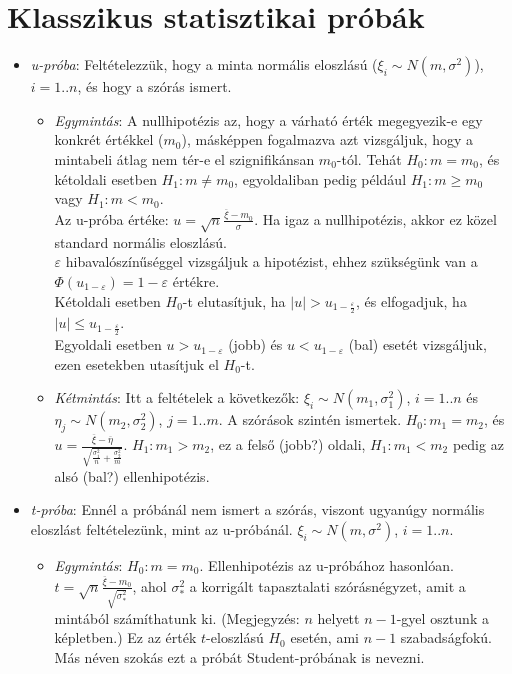 \documentclass[margin=0px]{article}
\begin{document}
\section{Klasszikus statisztikai próbák}

\begin{itemize}
    \item \textit{u-próba}: Feltételezzük, hogy a minta normális eloszlású ($\xi_i \sim N(m, \sigma^2)$), $i=1..n$, és hogy a szórás ismert.
          \begin{itemize}
              \item \textit{Egymintás}: A nullhipotézis az, hogy a várható érték megegyezik-e egy konkrét értékkel ($m_0$), másképpen fogalmazva azt vizsgáljuk, hogy a mintabeli átlag nem tér-e el szignifikánsan $m_0$-tól. Tehát $H_0: m = m_0$, és kétoldali esetben $H_1: m \neq m_0$, egyoldaliban pedig például $H_1: m \geq m_0$ vagy $H_1: m < m_0$. \\
                    Az u-próba értéke: $u = \sqrt{n}\frac{\overline{\xi} - m_0}{\sigma}$. Ha igaz a nullhipotézis, akkor ez közel standard normális eloszlású. \\
                    $\varepsilon$ hibavalószínűséggel vizsgáljuk a hipotézist, ehhez szükségünk van a $\Phi(u_{1-\varepsilon}) = 1 - \varepsilon$ értékre. \\
                    Kétoldali esetben $H_0$-t elutasítjuk, ha $|u| > u_{1-\frac{\varepsilon}{2}}$, és elfogadjuk, ha $|u| \leq u_{1-\frac{\varepsilon}{2}}$. \\
                    Egyoldali esetben $u > u_{1-\varepsilon}$ (jobb) és $u < u_{1-\varepsilon}$ (bal) esetét vizsgáljuk, ezen esetekben utasítjuk el $H_0$-t.
              \item \textit{Kétmintás}: Itt a feltételek a következők: $\xi_i \sim N(m_1, \sigma_1^2)$, $i=1..n$ és $\eta_j \sim N(m_2, \sigma_2^2)$, $j=1..m$. A szórások szintén ismertek. $H_0: m_1 = m_2$, és $u = \frac{\overline{\xi} - \overline{\eta}}{\sqrt{\frac{\sigma_1^2}{n} + \frac{\sigma_2^2}{m}}}$. $H_1 : m_1 > m_2$, ez a felső (jobb?) oldali, $H_1 : m_1 < m_2$ pedig az alsó (bal?) ellenhipotézis.
          \end{itemize}
    \item \textit{t-próba}:	Ennél a próbánál nem ismert a szórás, viszont ugyanúgy normális eloszlást feltételezünk, mint az u-próbánál. $\xi_i \sim N(m, \sigma^2)$, $i=1..n$.
          \begin{itemize}
              \item \textit{Egymintás}: $H_0: m = m_0$. Ellenhipotézis az u-próbához hasonlóan. $t = \sqrt{n}\frac{\overline{\xi} - m_0}{\sqrt{\sigma_{*}^2}}$, ahol $\sigma_{*}^2$ a korrigált tapasztalati szórásnégyzet, amit a mintából számíthatunk ki. (Megjegyzés: $n$ helyett $n-1$-gyel osztunk a képletben.) Ez az érték $t$-eloszlású $H_0$ esetén, ami $n-1$ szabadságfokú. Más néven szokás ezt a próbát Student-próbának is nevezni.

\end{itemize}
\end{itemize}
\end{document}
